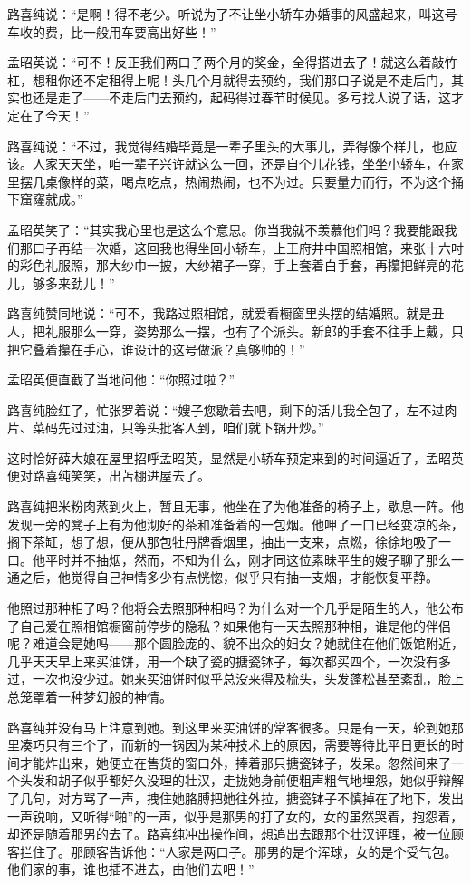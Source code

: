 \par 路喜纯说：“是啊！得不老少。听说为了不让坐小轿车办婚事的风盛起来，叫这号车收的费，比一般用车要高出好些！”
\par 孟昭英说：“可不！反正我们两口子两个月的奖金，全得搭进去了！就这么着敲竹杠，想租你还不定租得上呢！头几个月就得去预约，我们那口子说是不走后门，其实也还是走了——不走后门去预约，起码得过春节时候见。多亏找人说了话，这才定在了今天！”
\par 路喜纯说：“不过，我觉得结婚毕竟是一辈子里头的大事儿，弄得像个样儿，也应该。人家天天坐，咱一辈子兴许就这么一回，还是自个儿花钱，坐坐小轿车，在家里摆几桌像样的菜，喝点吃点，热闹热闹，也不为过。只要量力而行，不为这个捅下窟窿就成。”
\par 孟昭英笑了：“其实我心里也是这么个意思。你当我就不羡慕他们吗？我要能跟我们那口子再结一次婚，这回我也得坐回小轿车，上王府井中国照相馆，来张十六吋的彩色礼服照，那大纱巾一披，大纱裙子一穿，手上套着白手套，再攥把鲜亮的花儿，够多来劲儿！”
\par 路喜纯赞同地说：“可不，我路过照相馆，就爱看橱窗里头摆的结婚照。就是丑人，把礼服那么一穿，姿势那么一摆，也有了个派头。新郎的手套不往手上戴，只把它叠着攥在手心，谁设计的这号做派？真够帅的！”
\par 孟昭英便直截了当地问他：“你照过啦？”
\par 路喜纯脸红了，忙张罗着说：“嫂子您歇着去吧，剩下的活儿我全包了，左不过肉片、菜码先过过油，只等头批客人到，咱们就下锅开炒。”
\par 这时恰好薛大娘在屋里招呼孟昭英，显然是小轿车预定来到的时间逼近了，孟昭英便对路喜纯笑笑，出苫棚进屋去了。
\par 路喜纯把米粉肉蒸到火上，暂且无事，他坐在了为他准备的椅子上，歇息一阵。他发现一旁的凳子上有为他沏好的茶和准备着的一包烟。他呷了一口已经变凉的茶，搁下茶缸，想了想，便从那包牡丹牌香烟里，抽出一支来，点燃，徐徐地吸了一口。他平时并不抽烟，然而，不知为什么，刚才同这位素昧平生的嫂子聊了那么一通之后，他觉得自己神情多少有点恍惚，似乎只有抽一支烟，才能恢复平静。
\par 他照过那种相了吗？他将会去照那种相吗？为什么对一个几乎是陌生的人，他公布了自己爱在照相馆橱窗前停步的隐私？如果他有一天去照那种相，谁是他的伴侣呢？难道会是她吗——那个圆脸庞的、貌不出众的妇女？她就住在他们饭馆附近，几乎天天早上来买油饼，用一个缺了瓷的搪瓷钵子，每次都买四个，一次没有多过，一次也没少过。她来买油饼时似乎总没来得及梳头，头发蓬松甚至紊乱，脸上总笼罩着一种梦幻般的神情。
\par 路喜纯并没有马上注意到她。到这里来买油饼的常客很多。只是有一天，轮到她那里凑巧只有三个了，而新的一锅因为某种技术上的原因，需要等待比平日更长的时间才能炸出来，她便立在售货的窗口外，捧着那只搪瓷钵子，发呆。忽然间来了一个头发和胡子似乎都好久没理的壮汉，走拢她身前便粗声粗气地埋怨，她似乎辩解了几句，对方骂了一声，拽住她胳膊把她往外拉，搪瓷钵子不慎掉在了地下，发出一声锐响，又听得“啪”的一声，似乎是那男的打了女的，女的虽然哭着，抱怨着，却还是随着那男的去了。路喜纯冲出操作间，想追出去跟那个壮汉评理，被一位顾客拦住了。那顾客告诉他：“人家是两口子。那男的是个浑球，女的是个受气包。他们家的事，谁也插不进去，由他们去吧！”
